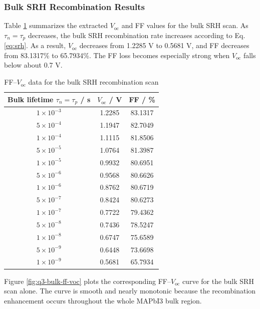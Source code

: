 \documentclass[12pt,a4paper,UTF8]{article}
\newcommand{\FloatBarrier}{\par\smallskip}
\begin{document}
\FloatBarrier

\subsubsection{Bulk SRH Recombination Results}
Table \ref{tab:q3-bulk} summarizes the extracted $V_\mathrm{oc}$ and FF values for the bulk SRH scan. As $\tau_n=\tau_p$ decreases, the bulk SRH recombination rate increases according to Eq. \eqref{eq:srh}. As a result, $V_\mathrm{oc}$ decreases from 1.2285 V to 0.5681 V, and FF decreases from 83.1317\% to 65.7934\%. The FF loss becomes especially strong when $V_\mathrm{oc}$ falls below about 0.7 V.

\begin{table}[H]
    \centering
    \caption{FF--$V_\mathrm{oc}$ data for the bulk SRH recombination scan}
    \label{tab:q3-bulk}
    \small
    \begin{tabular}{@{}ccc@{}}
        \toprule
        Bulk lifetime $\tau_n=\tau_p$ / s & $V_\mathrm{oc}$ / V & FF / \% \\
        \midrule
        $1\times10^{-3}$ & 1.2285 & 83.1317 \\
        $5\times10^{-4}$ & 1.1947 & 82.7049 \\
        $1\times10^{-4}$ & 1.1115 & 81.8506 \\
        $5\times10^{-5}$ & 1.0764 & 81.3987 \\
        $1\times10^{-5}$ & 0.9932 & 80.6951 \\
        $5\times10^{-6}$ & 0.9568 & 80.6626 \\
        $1\times10^{-6}$ & 0.8762 & 80.6719 \\
        $5\times10^{-7}$ & 0.8424 & 80.6273 \\
        $1\times10^{-7}$ & 0.7722 & 79.4362 \\
        $5\times10^{-8}$ & 0.7436 & 78.5247 \\
        $1\times10^{-8}$ & 0.6747 & 75.6589 \\
        $5\times10^{-9}$ & 0.6448 & 73.6698 \\
        $1\times10^{-9}$ & 0.5681 & 65.7934 \\
        \bottomrule
    \end{tabular}
\end{table}

Figure \ref{fig:q3-bulk-ff-voc} plots the corresponding FF--$V_\mathrm{oc}$ curve for the bulk SRH scan alone. The curve is smooth and nearly monotonic because the recombination enhancement occurs throughout the whole MAPbI3 bulk region.
\end{document}
